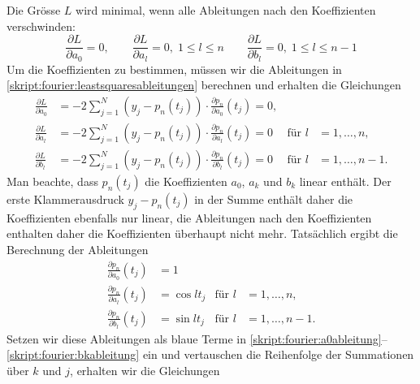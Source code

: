 Die Grösse $L$ wird minimal, wenn alle Ableitungen nach den Koeffizienten
verschwinden:
\begin{equation}
\frac{\partial L}{\partial a_0}=0,
\qquad
\frac{\partial L}{\partial a_l}=0, \;{1\le l\le n}
\qquad
\frac{\partial L}{\partial b_l}=0, \;{1\le l\le n-1}
\label{skript:fourier:leastsquaresableitungen}
\end{equation}
Um die Koeffizienten zu bestimmen, müssen wir die Ableitungen in
\eqref{skript:fourier:leastsquaresableitungen}
berechnen und erhalten die Gleichungen
\begin{align}
&&
\frac{\partial L}{\partial a_0}
&=
-2 \sum_{j=1}^N (y_j-p_n(t_j))\cdot \frac{\partial p_n}{\partial a_0}(t_j)=0,
&&
&&
\label{skript:fourier:a0ableitung}
\\
&&
\frac{\partial L}{\partial a_l}
&=
-2 \sum_{j=1}^N (y_j-p_n(t_j))\cdot \frac{\partial p_n}{\partial a_l}(t_j)=0
&\text{für }l&=1,\dots,n,
&&
\label{skript:fourier:akableitung}
\\
&&
\frac{\partial L}{\partial b_l}
&=
-2 \sum_{j=1}^N (y_j-p_n(t_j))\cdot \frac{\partial p_n}{\partial b_l}(t_j)=0
&\text{für }l&=1,\dots,n-1.
&&
\label{skript:fourier:bkableitung}
\end{align}
Man beachte, dass $p_n(t_j)$ die Koeffizienten $a_0$, $a_k$ und $b_k$
linear enthält.
Der erste Klammerausdruck $y_j-p_n(t_j)$ in der Summe enthält daher die
Koeffizienten ebenfalls nur linear, die Ableitungen nach den Koeffizienten
enthalten daher die Koeffizienten überhaupt nicht mehr.
Tatsächlich ergibt die Berechnung der Ableitungen
\begin{align}
&&&&&&
\frac{\partial p_n}{\partial a_0}(t_j)
&=
1
&&
&&&&&&
\label{skript:fourier:a0abl}
\\
&&&&&&
\frac{\partial p_n}{\partial a_l}(t_j)
&=
\cos lt_j
&\text{für }l&=1,\dots,n,
&&&&&&
\label{skript:fourier:akabl}
\\
&&&&&&
\frac{\partial p_n}{\partial b_l}(t_j)
&=
\sin lt_j
&\text{für }l&=1,\dots,n-1.
&&&&&&
\label{skript:fourier:bkabl}
\end{align}
%
Setzen wir diese Ableitungen als {\color{blue}blaue} Terme in
\eqref{skript:fourier:a0ableitung}--\eqref{skript:fourier:bkableitung} ein
und vertauschen die Reihenfolge der Summationen über $k$ und $j$,
erhalten wir die Gleichungen
%
